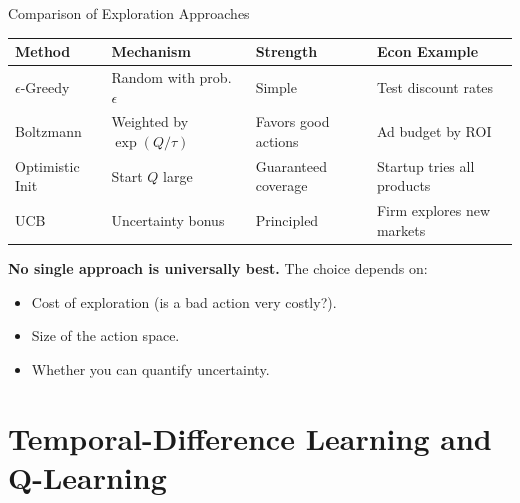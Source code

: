 \documentclass[10pt,english,aspectratio=169]{beamer}
\begin{document}
\begin{frame}{Comparison of Exploration Approaches}
    \small
    \begin{center}
    \begin{tabular}{llll}
        \toprule
        \textbf{Method} & \textbf{Mechanism} & \textbf{Strength} & \textbf{Econ Example} \\
        \midrule
        $\epsilon$-Greedy
        & Random with prob.\ $\epsilon$
        & Simple
        & Test discount rates \\
        Boltzmann
        & Weighted by $\exp(Q/\tau)$
        & Favors good actions
        & Ad budget by ROI \\
        Optimistic Init
        & Start $Q$ large
        & Guaranteed coverage
        & Startup tries all products \\
        UCB
        & Uncertainty bonus
        & Principled
        & Firm explores new markets \\
        \bottomrule
    \end{tabular}
    \end{center}

    \vspace{0.3cm}
    \textbf{No single approach is universally best.} The choice depends on:
    \begin{itemize}
        \item Cost of exploration (is a bad action very costly?).
        \item Size of the action space.
        \item Whether you can quantify uncertainty.
    \end{itemize}
\end{frame}


\section{Temporal-Difference Learning and Q-Learning}
\end{document}
